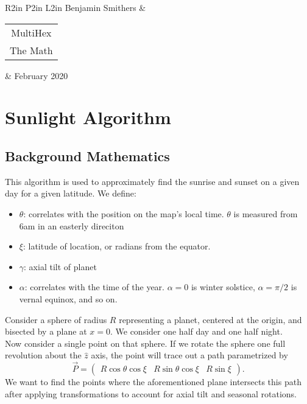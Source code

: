 \documentclass[12pt,a4paper]{article}
\begin{document}
\begin{table}
	\centering
	\begin{tabular}{R{2in} P{2in} L{2in}}
		Benjamin Smithers & \begin{tabular}{c}{\Large MultiHex} \\ {\Large The Math}  \end{tabular} & February 2020 \\\hline
	\end{tabular}

\end{table}

\section{Sunlight Algorithm}

\subsection{Background Mathematics}

This algorithm is used to approximately find the sunrise and sunset on a given day for a given latitude. We define:
\begin{itemize}
	\item \(\theta\): correlates with the position on the map's local time. \(\theta\) is measured from 6am in an easterly direciton
	\item \(\xi\): latitude of location, or radians from the equator. 
	\item \(\gamma\): axial tilt of planet
	\item \(\alpha\): correlates with the time of the year. \(\alpha=0\) is winter solstice, \(\alpha=\pi/2\) is vernal equinox, and so on.
\end{itemize}
Consider a sphere of radius \(R\) representing a planet, centered at the origin, and bisected by a plane at \(x=0\). We consider one half day and one half night. \\

Now consider a single point on that sphere. If we rotate the sphere one full revolution about the \(\hat{z}\) axis, the point will trace out a path parametrized by
\begin{equation}
\vec{P} = \left(\begin{array}{ccc} R\cos\theta\cos\xi & R\sin\theta\cos\xi & R\sin\xi \end{array}\right).
\end{equation}
We want to find the points where the aforementioned plane intersects this path after applying transformations to account for axial tilt and seasonal rotations. \\
\end{document}
